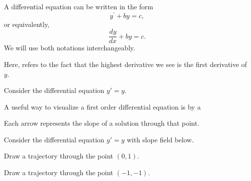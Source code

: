\begin{applicationActivities}
\begin{definition}
A  differential equation can be written in the form
\[y^\prime+by=c,\]
or equivalently,
\[\frac{dy}{dx} +by=c.\]
We will use both notations interchangeably.

Here,  refers to the fact that the highest derivative we see is the first derivative of \(y\).
\end{definition}

\begin{observation}
Consider the differential equation \(y'=y\).

A useful way to visualize a first order differential equation is by a 


\begin{center}\end{center}
Each arrow represents the slope of a solution  through that point.
\end{observation}

\begin{activity}{5}
Consider the differential equation \(y'=y\) with slope field below.

\begin{center}\end{center}
\begin{subactivity}
Draw a trajectory through the point \((0,1)\).
\end{subactivity}
\begin{subactivity}
Draw a trajectory through the point \((-1,-1)\).
\end{subactivity}
\end{activity}



\end{applicationActivities}

